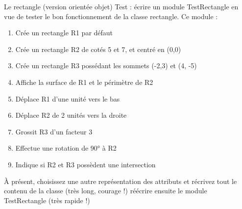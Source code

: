 \begin{Exercice}{Le rectangle (version orientée objet)}
	Test : écrire un module TestRectangle en vue de tester le bon
	fonctionnement de la classe rectangle. Ce module : 

	\begin{enumerate}[label=\alph*)]
		\item 
			Crée un rectangle R1 par défaut
		\item 
			Crée un rectangle R2 de cotés 5 et 7, et centré en (0,0)
		\item 
			Crée un rectangle R3 possédant les sommets (-2,3) et (4, -5)
		\item 
			Affiche la surface de R1 et le périmètre de R2
		\item 
			Déplace R1 d’une unité vers le bas
		\item 
			Déplace R2 de 2 unités vers la droite
		\item 
			Grossit R3 d’un facteur 3
		\item 
			Effectue une rotation de 90° à R2
		\item 
			Indique si R2 et R3 possèdent une intersection
	\end{enumerate}

	À présent, choisissez une autre représentation des attributs et récrivez
	tout le contenu de la classe (très long, courage !) réécrire ensuite le
	module TestRectangle (très rapide !)
\end{Exercice}